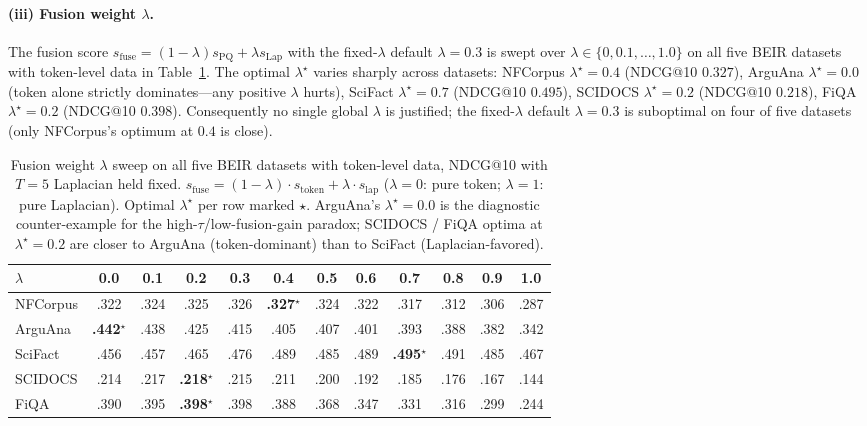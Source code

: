 \documentclass[review,1p]{elsarticle}
\begin{document}
\paragraph{(iii) Fusion weight $\lambda$.} The fusion score $s_{\mathrm{fuse}} = (1-\lambda) s_{\mathrm{PQ}} + \lambda s_{\mathrm{Lap}}$ with the fixed-$\lambda$ default $\lambda = 0.3$ is swept over $\lambda \in \{0, 0.1, \ldots, 1.0\}$ on all five BEIR datasets with token-level data in Table~\ref{tab:lambda-sweep}. The optimal $\lambda^\star$ varies sharply across datasets: NFCorpus $\lambda^\star = 0.4$ (NDCG@10 $0.327$), ArguAna $\lambda^\star = 0.0$ (token alone strictly dominates---any positive $\lambda$ hurts), SciFact $\lambda^\star = 0.7$ (NDCG@10 $0.495$), SCIDOCS $\lambda^\star = 0.2$ (NDCG@10 $0.218$), FiQA $\lambda^\star = 0.2$ (NDCG@10 $0.398$). Consequently no single global $\lambda$ is justified; the fixed-$\lambda$ default $\lambda = 0.3$ is suboptimal on four of five datasets (only NFCorpus's optimum at $0.4$ is close).

\begin{table}[h]
\centering
\small
\caption{Fusion weight $\lambda$ sweep on all five BEIR datasets with token-level data, NDCG@10 with $T=5$ Laplacian held fixed. $s_{\mathrm{fuse}} = (1-\lambda) \cdot s_{\mathrm{token}} + \lambda \cdot s_{\mathrm{lap}}$ ($\lambda=0$: pure token; $\lambda=1$: pure Laplacian). Optimal $\lambda^\star$ per row marked $\star$. ArguAna's $\lambda^\star = 0.0$ is the diagnostic counter-example for the high-$\tau$/low-fusion-gain paradox; SCIDOCS / FiQA optima at $\lambda^\star = 0.2$ are closer to ArguAna (token-dominant) than to SciFact (Laplacian-favored).}
\label{tab:lambda-sweep}
\begin{tabular}{lccccccccccc}
\toprule
$\lambda$ & 0.0 & 0.1 & 0.2 & 0.3 & 0.4 & 0.5 & 0.6 & 0.7 & 0.8 & 0.9 & 1.0 \\
\midrule
NFCorpus & .322 & .324 & .325 & .326 & \textbf{.327}$^\star$ & .324 & .322 & .317 & .312 & .306 & .287 \\
ArguAna & \textbf{.442}$^\star$ & .438 & .425 & .415 & .405 & .407 & .401 & .393 & .388 & .382 & .342 \\
SciFact & .456 & .457 & .465 & .476 & .489 & .485 & .489 & \textbf{.495}$^\star$ & .491 & .485 & .467 \\
SCIDOCS & .214 & .217 & \textbf{.218}$^\star$ & .215 & .211 & .200 & .192 & .185 & .176 & .167 & .144 \\
FiQA & .390 & .395 & \textbf{.398}$^\star$ & .398 & .388 & .368 & .347 & .331 & .316 & .299 & .244 \\
\bottomrule
\end{tabular}
\end{table}
\end{document}
